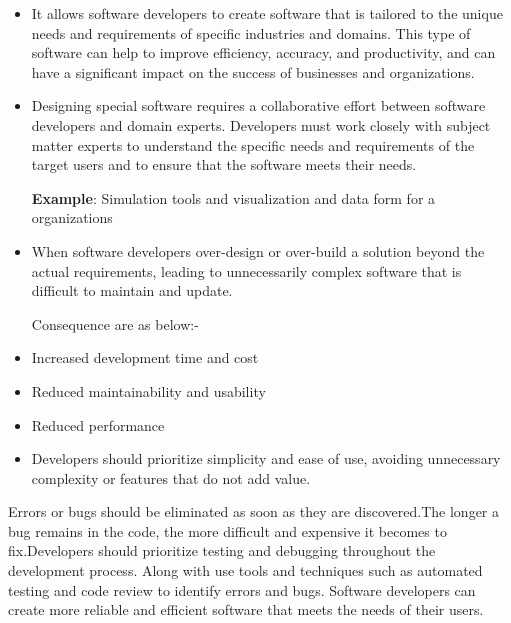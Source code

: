 
\STANDARD{}
{
	\begin{itemize}
		\item It allows software developers to create software that is tailored to the unique needs and requirements of specific industries and domains. This type of software can help to improve efficiency, accuracy, and productivity, and can have a significant impact on the success of businesses and organizations.\\ 
		
		\item Designing special software requires a collaborative effort between software developers and domain experts. Developers must work closely with subject matter experts to understand the specific needs and requirements of the target users and to ensure that the software meets their needs.\\ 
		
		\bigskip
		
		\textbf{Example}: Simulation tools and visualization and data form for a organizations
	\end{itemize}
}


\STANDARD{}
{
	\begin{itemize}
		\item When software developers over-design or over-build a solution beyond the actual requirements, leading to unnecessarily complex software that is difficult to maintain and update. \autocite{tornhill2018software}
		
		\bigskip
		
		Consequence are as below:-\\ 
		\item Increased development time and cost
		\item Reduced maintainability and usability
		\item Reduced performance
		\bigskip
		
		\item Developers should prioritize simplicity and ease of use, avoiding unnecessary complexity or features that do not add value.\\ 
		
	\end{itemize}
}


\STANDARD{}
{
	
		 Errors or bugs should be eliminated as soon as they are discovered.The longer a bug remains in the code, the more difficult and expensive it becomes to fix.Developers should prioritize testing and debugging throughout the development process. Along with use tools and techniques such as automated testing and code review to identify errors and bugs. Software developers can create more reliable and efficient software that meets the needs of their users.\\
		
}



